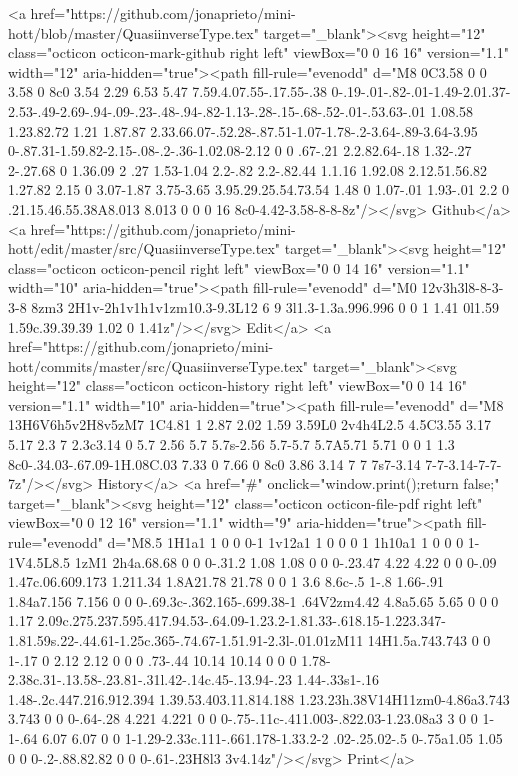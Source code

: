       <a href="https://github.com/jonaprieto/mini-hott/blob/master/QuasiinverseType.tex" target="_blank"><svg height="12" class="octicon octicon-mark-github right left" viewBox="0 0 16 16" version="1.1" width="12" aria-hidden="true"><path fill-rule="evenodd" d="M8 0C3.58 0 0 3.58 0 8c0 3.54 2.29 6.53 5.47 7.59.4.07.55-.17.55-.38 0-.19-.01-.82-.01-1.49-2.01.37-2.53-.49-2.69-.94-.09-.23-.48-.94-.82-1.13-.28-.15-.68-.52-.01-.53.63-.01 1.08.58 1.23.82.72 1.21 1.87.87 2.33.66.07-.52.28-.87.51-1.07-1.78-.2-3.64-.89-3.64-3.95 0-.87.31-1.59.82-2.15-.08-.2-.36-1.02.08-2.12 0 0 .67-.21 2.2.82.64-.18 1.32-.27 2-.27.68 0 1.36.09 2 .27 1.53-1.04 2.2-.82 2.2-.82.44 1.1.16 1.92.08 2.12.51.56.82 1.27.82 2.15 0 3.07-1.87 3.75-3.65 3.95.29.25.54.73.54 1.48 0 1.07-.01 1.93-.01 2.2 0 .21.15.46.55.38A8.013 8.013 0 0 0 16 8c0-4.42-3.58-8-8-8z"/></svg> Github</a>
      <a href="https://github.com/jonaprieto/mini-hott/edit/master/src/QuasiinverseType.tex" target="_blank"><svg height="12" class="octicon octicon-pencil right left" viewBox="0 0 14 16" version="1.1" width="10" aria-hidden="true"><path fill-rule="evenodd" d="M0 12v3h3l8-8-3-3-8 8zm3 2H1v-2h1v1h1v1zm10.3-9.3L12 6 9 3l1.3-1.3a.996.996 0 0 1 1.41 0l1.59 1.59c.39.39.39 1.02 0 1.41z"/></svg> Edit</a>
      <a href="https://github.com/jonaprieto/mini-hott/commits/master/src/QuasiinverseType.tex" target="_blank"><svg height="12" class="octicon octicon-history right left" viewBox="0 0 14 16" version="1.1" width="10" aria-hidden="true"><path fill-rule="evenodd" d="M8 13H6V6h5v2H8v5zM7 1C4.81 1 2.87 2.02 1.59 3.59L0 2v4h4L2.5 4.5C3.55 3.17 5.17 2.3 7 2.3c3.14 0 5.7 2.56 5.7 5.7s-2.56 5.7-5.7 5.7A5.71 5.71 0 0 1 1.3 8c0-.34.03-.67.09-1H.08C.03 7.33 0 7.66 0 8c0 3.86 3.14 7 7 7s7-3.14 7-7-3.14-7-7-7z"/></svg> History</a>
      <a  href="#" onclick="window.print();return false;" target="_blank"><svg height="12" class="octicon octicon-file-pdf right left" viewBox="0 0 12 16" version="1.1" width="9" aria-hidden="true"><path fill-rule="evenodd" d="M8.5 1H1a1 1 0 0 0-1 1v12a1 1 0 0 0 1 1h10a1 1 0 0 0 1-1V4.5L8.5 1zM1 2h4a.68.68 0 0 0-.31.2 1.08 1.08 0 0 0-.23.47 4.22 4.22 0 0 0-.09 1.47c.06.609.173 1.211.34 1.8A21.78 21.78 0 0 1 3.6 8.6c-.5 1-.8 1.66-.91 1.84a7.156 7.156 0 0 0-.69.3c-.362.165-.699.38-1 .64V2zm4.42 4.8a5.65 5.65 0 0 0 1.17 2.09c.275.237.595.417.94.53-.64.09-1.23.2-1.81.33-.618.15-1.223.347-1.81.59s.22-.44.61-1.25c.365-.74.67-1.51.91-2.3l-.01.01zM11 14H1.5a.743.743 0 0 1-.17 0 2.12 2.12 0 0 0 .73-.44 10.14 10.14 0 0 0 1.78-2.38c.31-.13.58-.23.81-.31l.42-.14c.45-.13.94-.23 1.44-.33s1-.16 1.48-.2c.447.216.912.394 1.39.53.403.11.814.188 1.23.23h.38V14H11zm0-4.86a3.743 3.743 0 0 0-.64-.28 4.221 4.221 0 0 0-.75-.11c-.411.003-.822.03-1.23.08a3 3 0 0 1-1-.64 6.07 6.07 0 0 1-1.29-2.33c.111-.661.178-1.33.2-2 .02-.25.02-.5 0-.75a1.05 1.05 0 0 0-.2-.88.82.82 0 0 0-.61-.23H8l3 3v4.14z"/></svg> Print</a>
